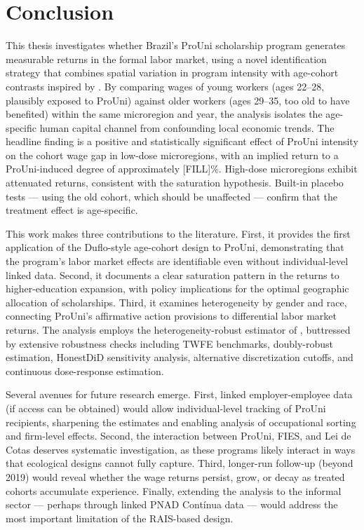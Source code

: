\chapter{Conclusion}
\label{ch:conclusion}

This thesis investigates whether Brazil's ProUni scholarship program generates measurable returns in the formal labor market, using a novel identification strategy that combines spatial variation in program intensity with age-cohort contrasts inspired by . By comparing wages of young workers (ages 22--28, plausibly exposed to ProUni) against older workers (ages 29--35, too old to have benefited) within the same microregion and year, the analysis isolates the age-specific human capital channel from confounding local economic trends. The headline finding is a positive and statistically significant effect of ProUni intensity on the cohort wage gap in low-dose microregions, with an implied return to a ProUni-induced degree of approximately [FILL]\%. High-dose microregions exhibit attenuated returns, consistent with the saturation hypothesis. Built-in placebo tests --- using the old cohort, which should be unaffected --- confirm that the treatment effect is age-specific.

This work makes three contributions to the literature. First, it provides the first application of the Duflo-style age-cohort design to ProUni, demonstrating that the program's labor market effects are identifiable even without individual-level linked data. Second, it documents a clear saturation pattern in the returns to higher-education expansion, with policy implications for the optimal geographic allocation of scholarships. Third, it examines heterogeneity by gender and race, connecting ProUni's affirmative action provisions to differential labor market returns. The analysis employs the heterogeneity-robust estimator of , buttressed by extensive robustness checks including TWFE benchmarks, doubly-robust estimation, HonestDiD sensitivity analysis, alternative discretization cutoffs, and continuous dose-response estimation.

Several avenues for future research emerge. First, linked employer-employee data (if access can be obtained) would allow individual-level tracking of ProUni recipients, sharpening the estimates and enabling analysis of occupational sorting and firm-level effects. Second, the interaction between ProUni, FIES, and Lei de Cotas deserves systematic investigation, as these programs likely interact in ways that ecological designs cannot fully capture. Third, longer-run follow-up (beyond 2019) would reveal whether the wage returns persist, grow, or decay as treated cohorts accumulate experience. Finally, extending the analysis to the informal sector --- perhaps through linked PNAD Cont\'{i}nua data --- would address the most important limitation of the RAIS-based design.
